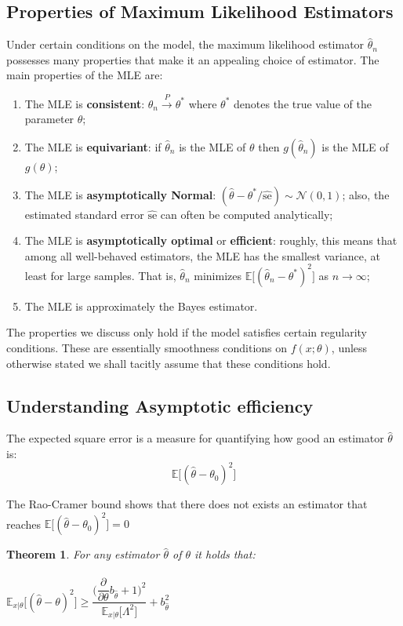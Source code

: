 \documentclass[twoside]{article}
\newcounter{lecnum}
\newtheorem{theorem}{Theorem}[lecnum]
\begin{document}
\subsection{Properties of Maximum Likelihood Estimators}
Under certain conditions on the model, the maximum likelihood estimator $\hat{\theta}_n$ possesses many properties that make it an appealing choice of estimator. The main properties of the MLE are:
\begin{enumerate}
    \item The MLE is \textbf{consistent}: $\hat{\theta}_n \overset{P}{\to} \theta^*$ where $\theta^*$ denotes the true value of the parameter $\theta$;
    \item The MLE is \textbf{equivariant}: if $\hat{\theta}_n$ is the MLE of $\theta$ then $g(\hat{\theta}_n)$ is the MLE of $g(\theta)$;
    \item  The MLE is \textbf{asymptotically Normal}: $(\hat{\theta} - \theta^* / \hat{\text{se}}) \sim \mathcal{N}(0, 1)$; also, the
estimated standard error $\hat{\text{se}}$ can often be computed analytically;
    \item The MLE is \textbf{asymptotically optimal} or \textbf{efficient}: roughly, this means that among all well-behaved estimators, the MLE has the smallest variance, at least for large samples. That is, $\hat{\theta}_n$ minimizes $\mathbb{E}\big[ (\hat{\theta}_n -\theta^*)^2\big]$ as  $n \to \infty$;
    \item The MLE is approximately the Bayes estimator.  
\end{enumerate}
The properties we discuss only hold if the model satisfies certain regularity conditions. These are essentially smoothness conditions on $f(x; \theta)$, unless otherwise stated we shall tacitly assume that these conditions hold.

\subsection{Understanding Asymptotic efficiency}
The expected square error is a measure for quantifying how good an estimator $\hat{\theta}$ is:
$$\mathbb{E}\big[ (\hat{\theta}- \theta_0)^2\big]$$

The Rao-Cramer bound shows that there does not exists an estimator that reaches $\mathbb{E}\big[ (\hat{\theta}- \theta_0)^2\big] = 0$

\begin{theorem}For any  estimator $\hat{\theta}$ of $\theta$ it holds that:\\\\
$\mathbb{E}_{x|\theta}\big[ (\hat{\theta} - \theta)^2\big] \geq \dfrac{\big(\dfrac{\partial}{\partial \theta} b_{\hat{\theta}} + 1 \big)^2}{\mathbb{E}_{x|\theta}\big[ \Lambda^2\big]} + b_{\hat{\theta}}^2$
\end{theorem}
\end{document}

